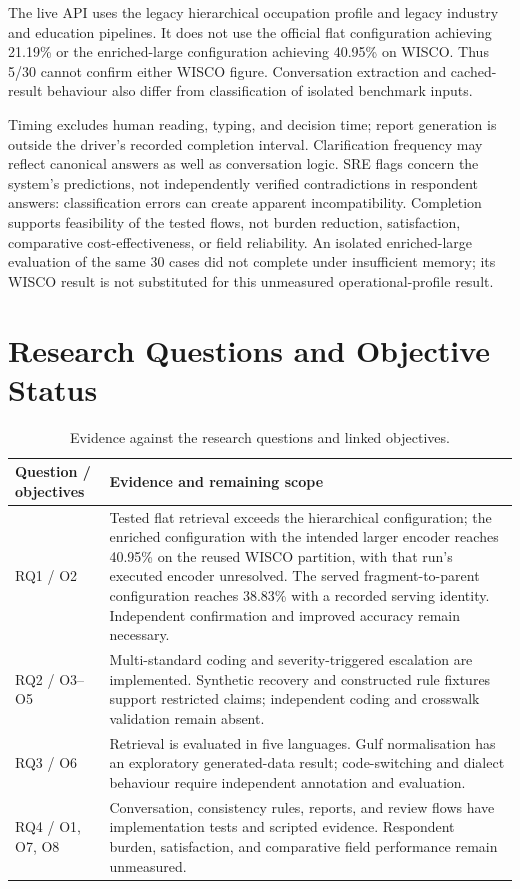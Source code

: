 The live API uses the legacy hierarchical occupation profile and legacy
industry and education pipelines. It does not use the official flat
configuration achieving 21.19\% or the enriched-large configuration
achieving 40.95\% on WISCO. Thus 5/30 cannot confirm either WISCO figure.
Conversation extraction and cached-result behaviour also differ from
classification of isolated benchmark inputs.

Timing excludes human reading, typing, and decision time; report generation
is outside the driver's recorded completion interval. Clarification
frequency may reflect canonical answers as well as conversation logic.
SRE flags concern the system's predictions, not independently verified
contradictions in respondent answers: classification errors can create
apparent incompatibility. Completion supports feasibility of the tested
flows, not burden reduction, satisfaction, comparative cost-effectiveness,
or field reliability. An isolated enriched-large evaluation of the same
30 cases did not complete under insufficient memory; its WISCO result
is not substituted for this unmeasured operational-profile result.

\section{Research Questions and Objective Status}
\label{sec:res-summary}

\begin{table}[htbp]
\centering
\caption{Evidence against the research questions and linked objectives.}
\label{tab:ch6-objectives}
\footnotesize\renewcommand{\arraystretch}{1.3}
\begin{tabular}{p{2.0cm}p{10.5cm}}
\toprule
\textbf{Question / objectives} & \textbf{Evidence and remaining scope} \\
\midrule
RQ1 / O2 & Tested flat retrieval exceeds the hierarchical configuration;
the enriched configuration with the intended larger encoder reaches
40.95\% on the reused WISCO partition, with that run's executed encoder
unresolved. The served fragment-to-parent configuration reaches 38.83\%
with a recorded serving identity. Independent confirmation and improved
accuracy remain necessary. \\
RQ2 / O3--O5 & Multi-standard coding and severity-triggered escalation
are implemented. Synthetic recovery and constructed rule fixtures support
restricted claims; independent coding and crosswalk validation remain absent. \\
RQ3 / O6 & Retrieval is evaluated in five languages. Gulf normalisation
has an exploratory generated-data result; code-switching and dialect
behaviour require independent annotation and evaluation. \\
RQ4 / O1, O7, O8 & Conversation, consistency rules, reports, and review
flows have implementation tests and scripted evidence. Respondent burden,
satisfaction, and comparative field performance remain unmeasured. \\
\bottomrule
\end{tabular}
\end{table}


